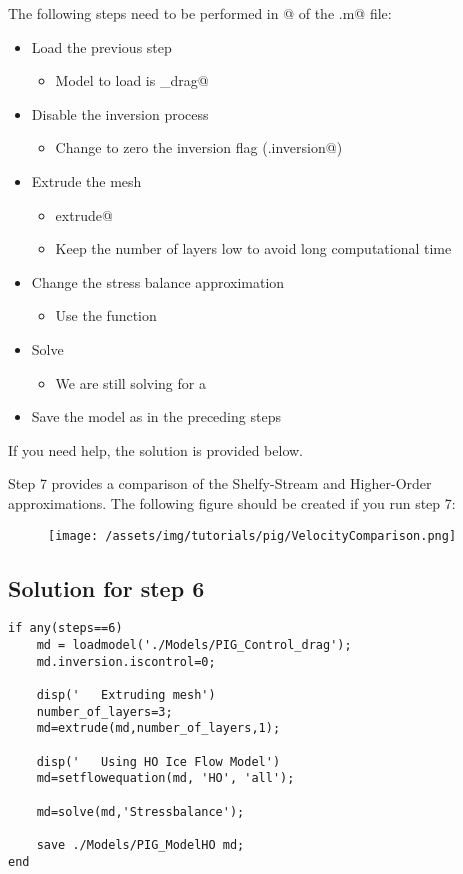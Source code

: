The following steps need to be performed in @ of the \verb@runme.m@ file:
\begin{itemize}
	\item Load the previous step
		\begin{itemize}
			\item Model to load is \verb@Control_drag@
		\end{itemize}
	\item Disable the inversion process
		\begin{itemize}
			\item Change \verb@iscontrol@ to zero the inversion flag (\verb@md.inversion@)
		\end{itemize}
	\item Extrude the mesh
		\begin{itemize}
			\item \verb@help extrude@
			\item Keep the number of layers low to avoid long computational time
		\end{itemize}
	\item Change the stress balance approximation
		\begin{itemize}
			\item Use the function \verb@setflowequation@
		\end{itemize}
	\item Solve
		\begin{itemize}
			\item We are still solving for a \verb@StressBalanceSolution@
		\end{itemize}
	\item Save the model as in the preceding steps
\end{itemize}

If you need help, the solution is provided below.

Step 7 provides a comparison of the Shelfy-Stream and Higher-Order approximations. The following figure should be created if you run step 7:
\begin{figure}[H]
	\begin{center}
		\texttt{[image: /assets/img/tutorials/pig/VelocityComparison.png]}
	\end{center}
\end{figure}
\subsection{Solution for step 6}%
\begin{verbatim}if any(steps==6)
	md = loadmodel('./Models/PIG_Control_drag');
	md.inversion.iscontrol=0;

	disp('   Extruding mesh')
	number_of_layers=3;
	md=extrude(md,number_of_layers,1);

	disp('   Using HO Ice Flow Model')
	md=setflowequation(md, 'HO', 'all');

	md=solve(md,'Stressbalance');

	save ./Models/PIG_ModelHO md;
end\end{verbatim}
